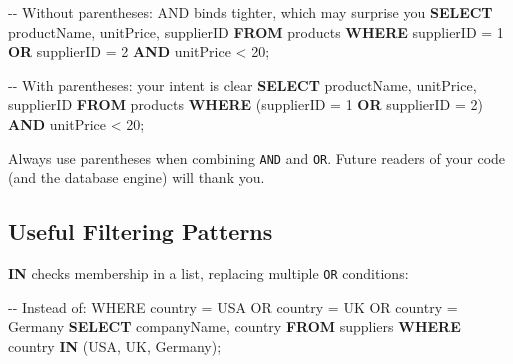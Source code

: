 \documentclass[
  letterpaper,
  DIV=11,
  numbers=noendperiod]{scrreprt}
\newenvironment{Shaded}{\begin{snugshade}}{\end{snugshade}}
\newcommand{\CommentTok}[1]{\textcolor[rgb]{0.37,0.37,0.37}{#1}}
\newcommand{\DecValTok}[1]{\textcolor[rgb]{0.68,0.00,0.00}{#1}}
\newcommand{\KeywordTok}[1]{\textcolor[rgb]{0.00,0.23,0.31}{\textbf{#1}}}
\newcommand{\NormalTok}[1]{\textcolor[rgb]{0.00,0.23,0.31}{#1}}
\newcommand{\OperatorTok}[1]{\textcolor[rgb]{0.37,0.37,0.37}{#1}}
\newcommand{\StringTok}[1]{\textcolor[rgb]{0.13,0.47,0.30}{#1}}
\begin{document}
\begin{codelisting}

\caption{\texttt{duckdb}}

\begin{Shaded}
\begin{Highlighting}[]
\CommentTok{{-}{-} Without parentheses: AND binds tighter, which may surprise you}
\KeywordTok{SELECT}\NormalTok{ productName, unitPrice, supplierID}
\KeywordTok{FROM}\NormalTok{ products}
\KeywordTok{WHERE}\NormalTok{ supplierID }\OperatorTok{=} \DecValTok{1} \KeywordTok{OR}\NormalTok{ supplierID }\OperatorTok{=} \DecValTok{2} \KeywordTok{AND}\NormalTok{ unitPrice }\OperatorTok{\textless{}} \DecValTok{20}\NormalTok{;}

\CommentTok{{-}{-} With parentheses: your intent is clear}
\KeywordTok{SELECT}\NormalTok{ productName, unitPrice, supplierID}
\KeywordTok{FROM}\NormalTok{ products}
\KeywordTok{WHERE}\NormalTok{ (supplierID }\OperatorTok{=} \DecValTok{1} \KeywordTok{OR}\NormalTok{ supplierID }\OperatorTok{=} \DecValTok{2}\NormalTok{) }\KeywordTok{AND}\NormalTok{ unitPrice }\OperatorTok{\textless{}} \DecValTok{20}\NormalTok{;}
\end{Highlighting}
\end{Shaded}

\end{codelisting}

Always use parentheses when combining \texttt{AND} and \texttt{OR}.
Future readers of your code (and the database engine) will thank you.

\subsection{Useful Filtering Patterns}\label{useful-filtering-patterns}

\textbf{IN} checks membership in a list, replacing multiple \texttt{OR}
conditions:

\begin{codelisting}

\caption{\texttt{duckdb}}

\begin{Shaded}
\begin{Highlighting}[]
\CommentTok{{-}{-} Instead of: WHERE country = \textquotesingle{}USA\textquotesingle{} OR country = \textquotesingle{}UK\textquotesingle{} OR country = \textquotesingle{}Germany\textquotesingle{}}
\KeywordTok{SELECT}\NormalTok{ companyName, country}
\KeywordTok{FROM}\NormalTok{ suppliers}
\KeywordTok{WHERE}\NormalTok{ country }\KeywordTok{IN}\NormalTok{ (}\StringTok{\textquotesingle{}USA\textquotesingle{}}\NormalTok{, }\StringTok{\textquotesingle{}UK\textquotesingle{}}\NormalTok{, }\StringTok{\textquotesingle{}Germany\textquotesingle{}}\NormalTok{);}
\end{Highlighting}
\end{Shaded}

\end{codelisting}
\end{document}
